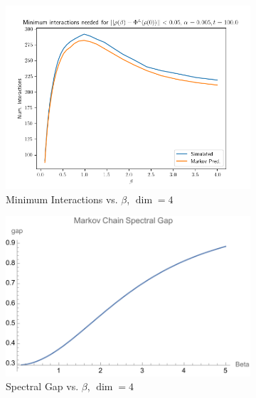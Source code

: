 \documentclass{article}
\begin{document}
\begin{figure}[t]
    \centering
    \begin{subfigure}{0.45\textwidth}
    \includegraphics[width=\textwidth]{numerics/data/sho_l_vs_beta.png}
    \caption{Minimum Interactions vs. $\beta$, $\dim = 4$}
    \label{fig:sho_l_vs_beta_dim_4}
    \end{subfigure}
    \begin{subfigure}{0.45\textwidth}
    \includegraphics[width=\textwidth]{numerics/data/spec_gap_dim_4.pdf}
    \caption{Spectral Gap vs. $\beta$, $\dim = 4$}
    \label{fig:sho_spectral_gap_vs_beta}
    \end{subfigure}
    \hfill
    \begin{subfigure}{0.5\textwidth}

\end{subfigure}
\end{figure}
\end{document}

